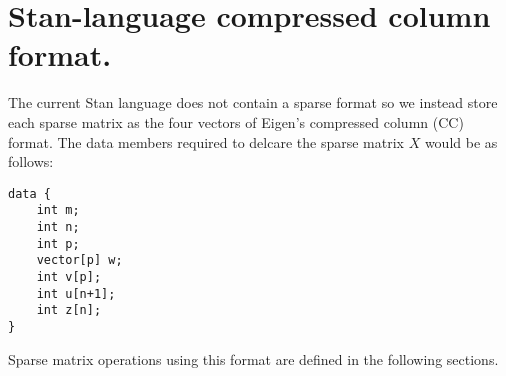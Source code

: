 \section{Stan-language compressed column format.}

The current Stan language does not contain a sparse format so we instead
store each sparse matrix as the four vectors of Eigen's compressed
column (CC) format.  The data members required to delcare the sparse
matrix $X$ would be as follows:

\wrappingon
\begin{verbatim}
data {
	int m;
	int n;
	int p;
	vector[p] w;
	int v[p];
	int u[n+1];
	int z[n];
}
\end{verbatim}
\wrappingoff

Sparse matrix operations using this format are defined in the following
sections.





